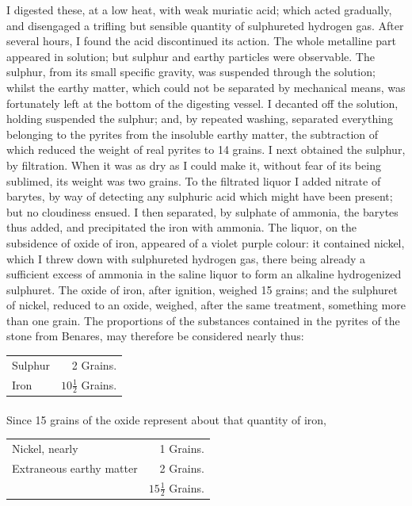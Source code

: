 \documentclass[a4paper, 12pt, oneside, twocolumn]{article}
\begin{document}
I digested these, at a low heat, with weak muriatic acid; which acted gradually, and disengaged a trifling but sensible quantity of sulphureted hydrogen gas. After several hours, I found the acid discontinued its action. The whole metalline part appeared in solution; but sulphur and earthy particles were observable. The sulphur, from its small specific gravity, was suspended through the solution; whilst the earthy matter, which could not be separated by mechanical means, was fortunately left at the bottom of the digesting vessel. I decanted off the solution, holding suspended the sulphur; and, by repeated washing, separated everything belonging to the pyrites from the insoluble earthy matter, the subtraction of which reduced the weight of real pyrites to 14 grains. I next obtained the sulphur, by filtration. When it was as dry as I could make it, without fear of its being sublimed, its weight was two grains. To the filtrated liquor I added nitrate of barytes, by way of detecting any sulphuric acid which might have been present; but no cloudiness ensued. I then separated, by sulphate of ammonia, the barytes thus added, and precipitated the iron with ammonia. The liquor, on the subsidence of oxide of iron, appeared of a violet purple colour: it contained nickel, which I threw down with sulphureted hydrogen gas, there being already a sufficient excess of ammonia in the saline liquor to form an alkaline hydrogenized sulphuret. The oxide of iron, after ignition, weighed 15 grains; and the sulphuret of nickel, reduced to an oxide, weighed, after the same treatment, something more than one grain. The proportions of the substances contained in the pyrites of the stone from Benares, may therefore be considered nearly thus:
\begin{table}[H]
    \centering\bfseries
    \begin{tabular}{l r}
        Sulphur & 2 Grains.  \\
        Iron & $10\frac{1}{2}$ Grains. \\
    \end{tabular}
\end{table}
\paragraph{}
Since 15 grains of the oxide represent about that quantity of iron,
\begin{table}[H]
    \centering\bfseries
    \begin{tabular}{l r}
        Nickel, nearly & 1 Grains.   \\
        Extraneous earthy matter & 2 Grains. \\ \hline
        ~ & $15\frac{1}{2}$ Grains. \\ 
    \end{tabular}
\end{table}
\end{document}
